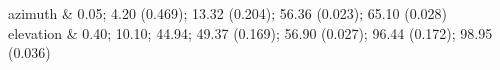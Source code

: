 azimuth & 0.05; 4.20 (0.469); 13.32 (0.204); 56.36 (0.023); 65.10 (0.028) \\
elevation & 0.40; 10.10; 44.94; 49.37 (0.169); 56.90 (0.027); 96.44 (0.172); 98.95 (0.036)
